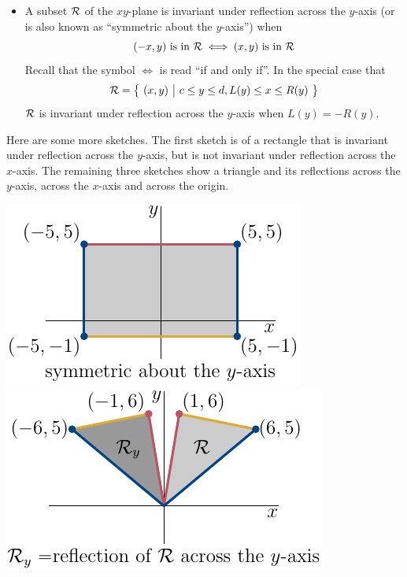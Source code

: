 \begin{itemize}
\item A subset $\mathcal{R}$ of the $xy$-plane is invariant under reflection across the $y$-axis (or is also known as ``symmetric about the $y$-axis'') when
\begin{equation*}
(-x,y)\text{ is in }\mathcal{R}
\iff
(x,y)\text{ is in }\mathcal{R}
\end{equation*}   
Recall that the symbol $\iff$ is read ``if and only if''. In the special case
that 
\begin{equation*}
\mathcal{R}=\big\{ \ (x,y)\ \big|\ c\le y\le d, L(y)\le x\le R(y)\ \big\}
\end{equation*}
$\mathcal{R}$ is invariant under reflection across the $y$-axis when $L(y)=-R(y)$.
\end{itemize} 
Here are some more sketches. The first sketch is of a rectangle that is
invariant under reflection across the $y$-axis, but is not invariant under reflection across the $x$-axis. The remaining three sketches show a triangle 
and its reflections across the $y$-axis, across the $x$-axis and across 
the origin.

\begin{wfig}
\begin{center}
   \includegraphics[scale=1.0]{reflDySym.pdf}\quad
   \includegraphics[scale=1.0]{reflDy.pdf}
\end{center}
\end{wfig}

